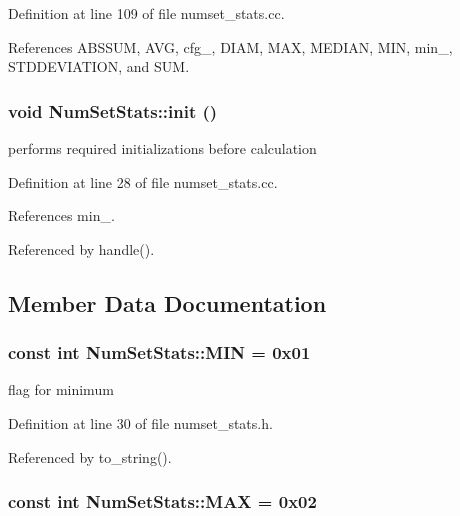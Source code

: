 Definition at line 109 of file numset\_\-stats.cc.

References ABSSUM, AVG, cfg\_\-, DIAM, MAX, MEDIAN, MIN, min\_\-, STDDEVIATION, and SUM.\hypertarget{class_num_set_stats_c16a5891e33db010aac26d062de620fd}{
\subsubsection[init]{\setlength{\rightskip}{0pt plus 5cm}void NumSetStats::init ()}}
\label{class_num_set_stats_c16a5891e33db010aac26d062de620fd}


performs required initializations before calculation 

Definition at line 28 of file numset\_\-stats.cc.

References min\_\-.

Referenced by handle().

\subsection{Member Data Documentation}
\hypertarget{class_num_set_stats_a650f090e33b5d6e21b4cb20d567d7d4}{
\subsubsection[MIN]{\setlength{\rightskip}{0pt plus 5cm}const int {\bf NumSetStats::MIN} = 0x01}}
\label{class_num_set_stats_a650f090e33b5d6e21b4cb20d567d7d4}


flag for minimum 

Definition at line 30 of file numset\_\-stats.h.

Referenced by to\_\-string().\hypertarget{class_num_set_stats_b9a7841be40024bbf113e9c936b3deab}{
\subsubsection[MAX]{\setlength{\rightskip}{0pt plus 5cm}const int {\bf NumSetStats::MAX} = 0x02}}
\label{class_num_set_stats_b9a7841be40024bbf113e9c936b3deab}


